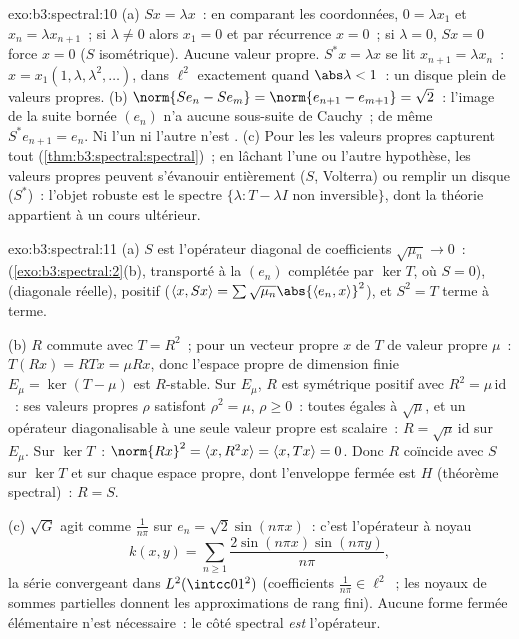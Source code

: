 \begin{solution}{exo:b3:spectral:10}
(a) $Sx = \lambda x$~: en comparant les coordonnées, $0 =
\lambda x_1$ et $x_n = \lambda x_{n+1}$~; si $\lambda \ne 0$
alors $x_1 = 0$ et par récurrence $x = 0$~; si $\lambda =
0$, $Sx = 0$ force $x = 0$ ($S$ isométrique). Aucune valeur
propre. $S^*x = \lambda x$ se lit $x_{n+1} = \lambda x_n$~:
$x = x_1(1, \lambda, \lambda^2, \dots)$, dans $\ell^2$
exactement quand $\abs\lambda < 1$~: un disque  plein
de valeurs propres.
(b) $\norm{Se_n - Se_m} = \norm{e_{n+1} - e_{m+1}} =
\sqrt2$~: l'image de la suite bornée $(e_n)$ n'a aucune
sous-suite de Cauchy~; de même $S^*e_{n+1} = e_n$. Ni l'un
ni l'autre n'est .
(c) Pour les   les valeurs
propres capturent tout (\cref{thm:b3:spectral:spectral})~; en
lâchant l'une ou l'autre hypothèse, les valeurs propres
peuvent s'évanouir entièrement ($S$, Volterra) ou remplir un
disque ($S^*$)~: l'objet robuste est le spectre $\{\lambda :
T - \lambda I \text{ non inversible}\}$, dont la théorie
appartient à un cours ultérieur.
\end{solution}

\begin{solution}{exo:b3:spectral:11}
(a) $S$ est l'opérateur diagonal de coefficients
$\sqrt{\mu_n} \to 0$~: 
(\cref{exo:b3:spectral:2}(b), transporté à la  $(e_n)$
complétée par $\ker T$, où $S = 0$),  (diagonale
réelle), positif ($\langle x, Sx\rangle =
\sum\sqrt{\mu_n}\abs{\langle e_n, x\rangle}^2$), et $S^2 =
T$ terme à terme.

(b) $R$ commute avec $T = R^2$~; pour un vecteur propre $x$
de $T$ de valeur propre $\mu$~: $T(Rx) = RTx = \mu Rx$, donc
l'espace propre de dimension finie $E_\mu = \ker(T - \mu)$
est $R$-stable. Sur $E_\mu$, $R$ est symétrique positif avec
$R^2 = \mu\,\mathrm{id}$~: ses valeurs propres $\rho$
satisfont $\rho^2 = \mu$, $\rho \geq 0$~: toutes égales à
$\sqrt\mu$, et un opérateur diagonalisable à une seule
valeur propre est scalaire~: $R = \sqrt\mu\,\mathrm{id}$ sur
$E_\mu$. Sur $\ker T$~: $\norm{Rx}^2 = \langle x,
R^2x\rangle = \langle x, Tx\rangle = 0$. Donc $R$ coïncide
avec $S$ sur $\ker T$ et sur chaque espace propre, dont
l'enveloppe fermée est $H$ (théorème spectral)~: $R = S$.

(c) $\sqrt G$ agit comme $\frac1{n\pi}$ sur $e_n =
\sqrt2\sin(n\pi x)$~: c'est l'opérateur à noyau
\[
k(x, y) = \sum_{n\geq1}\frac{2\sin(n\pi x)\sin(n\pi
y)}{n\pi},
\]
la série convergeant dans $L^2(\intcc01^2)$ (coefficients
$\frac1{n\pi} \in \ell^2$~; les noyaux de sommes partielles
donnent les approximations de rang fini). Aucune forme
fermée élémentaire n'est nécessaire~: le côté spectral
\emph{est} l'opérateur.
\end{solution}


